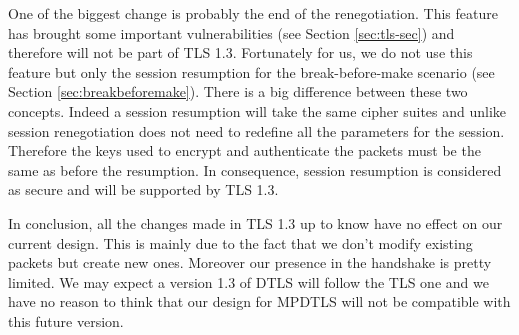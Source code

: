 One of the biggest change is probably the end of the renegotiation. This feature has brought some important vulnerabilities (see Section \ref{sec:tls-sec}) and therefore will not be part of TLS 1.3. Fortunately for us, we do not use this feature but only the session resumption for the break-before-make scenario (see Section \ref{sec:breakbeforemake}). There is a big difference between these two concepts. Indeed a session resumption will take the same cipher suites and unlike session renegotiation does not need to redefine all the parameters for the session. Therefore the keys used to encrypt and authenticate the packets must be the same as before the resumption. In consequence, session resumption is considered as secure and will be supported by TLS 1.3.

In conclusion, all the changes made in TLS 1.3 up to know have no effect on our current design. This is mainly due to the fact that we don't modify existing packets but create new ones. Moreover our presence in the handshake is pretty limited. We may expect a version 1.3 of DTLS will follow the TLS one and we have no reason to think that our design for MPDTLS will not be compatible with this future version.